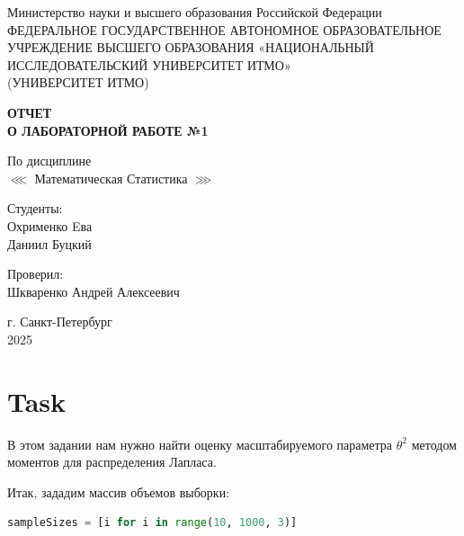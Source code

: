 \documentclass[14pt]{extreport}
\begin{document}
\begin{titlepage}
    \centering
    \vspace*{1cm}

    {\large Министерство науки и высшего образования Российской Федерации}\\
    {\large ФЕДЕРАЛЬНОЕ ГОСУДАРСТВЕННОЕ АВТОНОМНОЕ ОБРАЗОВАТЕЛЬНОЕ УЧРЕЖДЕНИЕ ВЫСШЕГО ОБРАЗОВАНИЯ «НАЦИОНАЛЬНЫЙ ИССЛЕДОВАТЕЛЬСКИЙ УНИВЕРСИТЕТ ИТМО»}\\
    {\large (УНИВЕРСИТЕТ ИТМО)}\\

    \vspace{1cm}

    \textbf{{\Huge ОТЧЕТ}\\
    {\Huge О ЛАБОРАТОРНОЙ РАБОТЕ №1}}\\

    \vspace{1cm}

    {\LARGE По дисциплине\\
     \(\lll\) Математическая Статистика \(\ggg\) }\\

    \vspace{2cm}

    {\Large Студенты:}\\
    Охрименко Eва\\
    Даниил Буцкий


    \vspace{2cm}

    {\Large Проверил:}\\
    Шкваренко Андрей Алексеевич\\

    \vspace{2cm}

    {\large г. Санкт-Петербург}\\
    {\large 2025}

\end{titlepage}
\newpage
\tableofcontents
\newpage

\section{Task}

В этом задании нам нужно найти оценку масштабируемого параметра \( \theta^2 \)
методом моментов для распределения Лапласа.

Итак, зададим массив объемов выборки:

\begin{lstlisting}[language=Python, caption={Массив объемов выборок}]
sampleSizes = [i for i in range(10, 1000, 3)]
\end{lstlisting}
\end{document}
